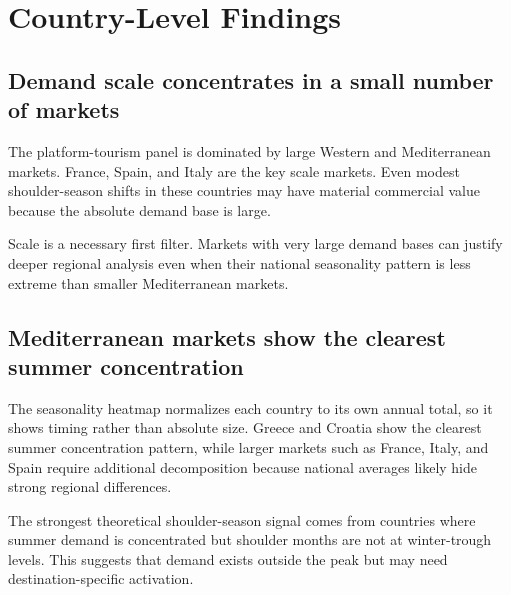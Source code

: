 \section{Country-Level Findings}

\subsection{Demand scale concentrates in a small number of markets}

The platform-tourism panel is dominated by large Western and Mediterranean markets. France, Spain, and Italy are the key scale markets. Even modest shoulder-season shifts in these countries may have material commercial value because the absolute demand base is large.

\begin{finding}
Scale is a necessary first filter. Markets with very large demand bases can justify deeper regional analysis even when their national seasonality pattern is less extreme than smaller Mediterranean markets.
\end{finding}


\subsection{Mediterranean markets show the clearest summer concentration}

The seasonality heatmap normalizes each country to its own annual total, so it shows timing rather than absolute size. Greece and Croatia show the clearest summer concentration pattern, while larger markets such as France, Italy, and Spain require additional decomposition because national averages likely hide strong regional differences.

\begin{finding}
The strongest theoretical shoulder-season signal comes from countries where summer demand is concentrated but shoulder months are not at winter-trough levels. This suggests that demand exists outside the peak but may need destination-specific activation.
\end{finding}


